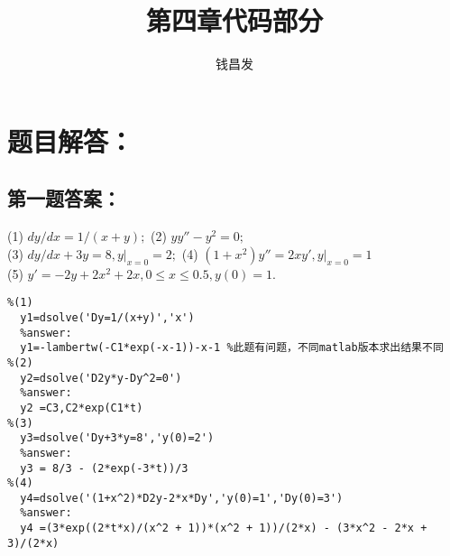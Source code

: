 \documentclass[oneside]{ctexart}
\begin{document}
\title{第四章代码部分}
\author{钱昌发}
\maketitle
\section{题目解答：}
\subsection{第一题答案：}
\noindent (1)
$dy/dx=1/(x+y);$
(2)
$yy''-y^2=0;$\\
(3)
$dy/dx+3y=8,y|_{x=0}=2;$
(4)
$(1+x^2)y''=2xy',y|_{x=0}=1$\\
(5)
$y'=-2y+2x^2+2x,0\le x\le0.5,y(0)=1.$

\begin{lstlisting}
%(1)
  y1=dsolve('Dy=1/(x+y)','x')
  %answer:
  y1=-lambertw(-C1*exp(-x-1))-x-1 %此题有问题，不同matlab版本求出结果不同
%(2)
  y2=dsolve('D2y*y-Dy^2=0')
  %answer:
  y2 =C3,C2*exp(C1*t)
%(3)
  y3=dsolve('Dy+3*y=8','y(0)=2')
  %answer:
  y3 = 8/3 - (2*exp(-3*t))/3
%(4)
  y4=dsolve('(1+x^2)*D2y-2*x*Dy','y(0)=1','Dy(0)=3')
  %answer:
  y4 =(3*exp((2*t*x)/(x^2 + 1))*(x^2 + 1))/(2*x) - (3*x^2 - 2*x + 3)/(2*x)
\end{lstlisting}
\end{document}
